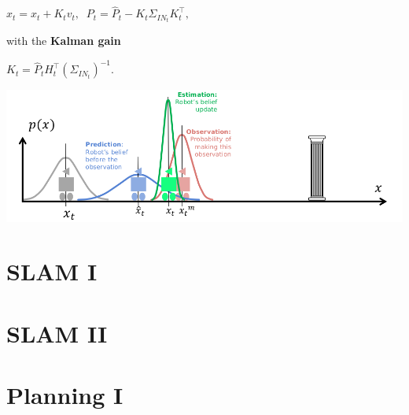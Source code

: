 \documentclass[landscape]{article}
\newcommand{\vmspace}{\vspace{-7pt}}
\newcommand{\vtspace}{\vspace{-10pt}}
\begin{document}
\begin{multicols}{3}
\begin{minipage}{\columnwidth}
\begin{compactenum}
    \begin{center}
      $
      x_t = \hat x_t + K_t v_t,\;\;
      P_t = \hat P_t - K_t \Sigma_{IN_t}K_t^\intercal,
      $
    \end{center}

    with the \textbf{Kalman gain}

    \begin{center}
      $
      K_t = \hat P_t H_t^\intercal (\Sigma_{IN_t})^{-1}.
      $
    \end{center}

  \end{compactenum}
  \includegraphics[width=\columnwidth]{img/9_Kalman.png}
\end{minipage}


\vfill

\vtspace

\section{SLAM I}

\vmspace

\blindtext[3]

\vfill

\vtspace

\section{SLAM II}

\vmspace

\blindtext[3]

\vfill

\vtspace

\section{Planning I}

\vmspace


\end{multicols}
\end{document}
